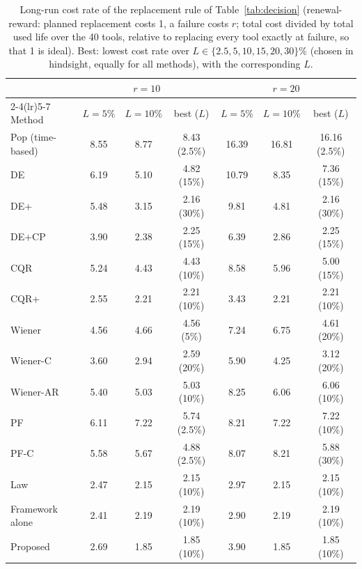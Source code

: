 \begin{table}[!tbp]
\centering
\caption{Long-run cost rate of the replacement rule of Table~\ref{tab:decision} (renewal-reward: planned replacement costs 1, a failure costs $r$; total cost divided by total used life over the 40 tools, relative to replacing every tool exactly at failure, so that 1 is ideal). Best: lowest cost rate over $L\in\{2.5,5,10,15,20,30\}\%$ (chosen in hindsight, equally for all methods), with the corresponding $L$.}
\label{tab:cost}
\footnotesize\setlength{\tabcolsep}{3.5pt}
\begin{tabular}{lcccccc}
\toprule
 & \multicolumn{3}{c}{$r=10$} & \multicolumn{3}{c}{$r=20$}\\
\cmidrule(lr){2-4}\cmidrule(lr){5-7}
Method & $L=5\%$ & $L=10\%$ & best ($L$) & $L=5\%$ & $L=10\%$ & best ($L$)\\
\midrule
Pop (time-based) & 8.55 & 8.77 & 8.43 (2.5\%) & 16.39 & 16.81 & 16.16 (2.5\%)\\
DE & 6.19 & 5.10 & 4.82 (15\%) & 10.79 & 8.35 & 7.36 (15\%)\\
DE+ & 5.48 & 3.15 & 2.16 (30\%) & 9.81 & 4.81 & 2.16 (30\%)\\
DE+CP & 3.90 & 2.38 & 2.25 (15\%) & 6.39 & 2.86 & 2.25 (15\%)\\
CQR & 5.24 & 4.43 & 4.43 (10\%) & 8.58 & 5.96 & 5.00 (15\%)\\
CQR+ & 2.55 & 2.21 & 2.21 (10\%) & 3.43 & 2.21 & 2.21 (10\%)\\
Wiener & 4.56 & 4.66 & 4.56 (5\%) & 7.24 & 6.75 & 4.61 (20\%)\\
Wiener-C & 3.60 & 2.94 & 2.59 (20\%) & 5.90 & 4.25 & 3.12 (20\%)\\
Wiener-AR & 5.40 & 5.03 & 5.03 (10\%) & 8.25 & 6.06 & 6.06 (10\%)\\
PF & 6.11 & 7.22 & 5.74 (2.5\%) & 8.21 & 7.22 & 7.22 (10\%)\\
PF-C & 5.58 & 5.67 & 4.88 (2.5\%) & 8.07 & 8.21 & 5.88 (30\%)\\
Law & 2.47 & 2.15 & 2.15 (10\%) & 2.97 & 2.15 & 2.15 (10\%)\\
Framework alone & 2.41 & 2.19 & 2.19 (10\%) & 2.90 & 2.19 & 2.19 (10\%)\\
Proposed & 2.69 & 1.85 & 1.85 (10\%) & 3.90 & 1.85 & 1.85 (10\%)\\
\bottomrule
\end{tabular}
\end{table}
